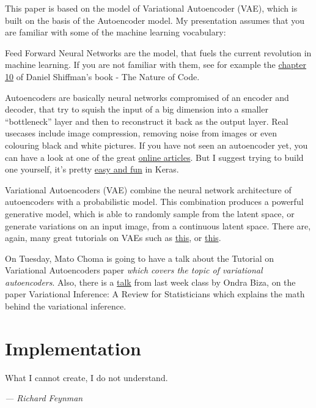 \documentclass{article}
\begin{document}
This paper is based on the model of Variational Autoencoder (VAE), which is built on the basis of the Autoencoder model. My presentation assumes that you are familiar with some of the machine learning vocabulary:
\begin{description}
    \item{Feed Forward Neural Networks} are the model, that fuels the current revolution in machine learning. If you are not familiar with them, see for example the \href{https://natureofcode.com/book/chapter-10-neural-networks/}{chapter 10} of Daniel Shiffman's book - The Nature of Code.
    \item{Autoencoders} are basically neural networks compromised of an encoder and decoder, that try to squish the input of a big dimension into a smaller ``bottleneck'' layer and then to reconstruct it back as the output layer. Real usecases include image compression, removing noise from images or even colouring black and white pictures. If you have not seen an autoencoder yet, you can have a look at one of the great \href{https://towardsdatascience.com/applied-deep-learning-part-3-autoencoders-1c083af4d798}{online articles}. But I suggest trying to build one yourself, it's pretty \href{https://blog.keras.io/building-autoencoders-in-keras.html}{easy and fun} in Keras.
    \item{Variational Autoencoders (VAE)} combine the neural network architecture of autoencoders with a probabilistic model. This combination produces a powerful generative model, which is able to randomly sample from the latent space, or generate variations on an input image, from a continuous latent space. There are, again, many great tutorials on VAEs such as \href{https://jaan.io/what-is-variational-autoencoder-vae-tutorial/}{this}, or \href{https://towardsdatascience.com/intuitively-understanding-variational-autoencoders-1bfe67eb5daf}{this}.
\end{description}

On Tuesday, Mato Choma is going to have a talk about the Tutorial on Variational Autoencoders\cite{doersch2016tutorial} paper \emph{which covers the topic of variational autoencoders}. Also, there is a \href{https://courses.fit.cvut.cz/BI-SZ1/talks/2019/03/handout.pdf}{talk} from last week class by Ondra Biza, on the paper Variational Inference: A Review for Statisticians\cite{blei2017variational} which explains the math behind the variational inference.

\clearpage
\section{Implementation}
\epigraph{What I cannot create, I do not understand.}{\textit{--- Richard Feynman}}
\end{document}
